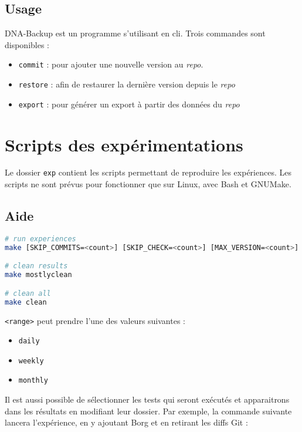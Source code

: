 \documentclass[a4paper]{report}
\begin{document}
\subsection{Usage}

DNA-Backup est un programme s'utilisant en \ac{cli}.
Trois commandes sont disponibles :

\begin{itemize}
  \item \verb|commit| : pour ajouter une nouvelle version au \emph{repo}.
  \item \verb|restore| : afin de restaurer la dernière version depuis le \emph{repo}
  \item \verb|export| : pour générer un export à partir des données du \emph{repo}
\end{itemize}

\section{Scripts des expérimentations}
\label{sec:experimentations}

Le dossier \verb|exp| contient les scripts permettant de reproduire les expériences.
Les scripts ne sont prévus pour fonctionner que sur Linux, avec Bash et GNUMake.

\subsection{Aide}


\begin{lstlisting}[language=sh]
# run experiences
make [SKIP_COMMITS=<count>] [SKIP_CHECK=<count>] [MAX_VERSION=<count>] [RANGE=<range>]

# clean results
make mostlyclean

# clean all
make clean
\end{lstlisting}

\verb|<range>| peut prendre l'une des valeurs suivantes :

\begin{itemize}
  \item \verb|daily|
  \item \verb|weekly|
  \item \verb|monthly|
\end{itemize}

Il est aussi possible de sélectionner les tests qui seront exécutés
et apparaitrons dans les résultats en modifiant leur dossier.
Par exemple, la commande suivante lancera l'expérience, en y ajoutant Borg et en retirant les diffs Git :
\end{document}
